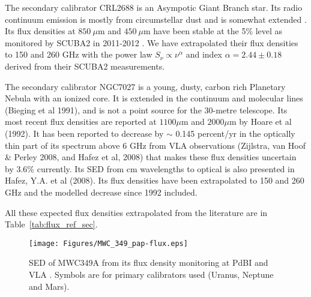 
The secondary calibrator CRL2688 is an Asympotic Giant Branch
star. Its radio continuum emission is mostly from circumstellar dust
and is somewhat extended \cite{Knapp}.  Its flux densities at
$850\ \mu$m and $450 \ \mu$m have been stable at the 5\% level as
monitored by SCUBA2 in 2011-2012
\cite{Dempsey}. We have extrapolated their flux densities to  150 and 260 GHz
with the power law $S_{\nu} \propto \nu^{\alpha}$ and index
$\alpha=2.44\pm0.18$ derived from their SCUBA2 measurements.


The secondary calibrator NGC7027 is a young, dusty, carbon rich
Planetary Nebula with an ionized core.  It is extended in the
continuum and molecular lines (Bieging et al 1991), and is not a point
source for the 30-metre telescope.  Its most recent flux densities are
reported at $1100\mu$m and $2000\mu$m by Hoare et al (1992). It has
been reported to decrease by $\sim$ 0.145 percent/yr in the optically
thin part of its spectrum above $6$ GHz from VLA observations
(Zijlstra, van Hoof \& Perley 2008, and Hafez et al, 2008) that makes
these flux densities uncertain by 3.6\% currently. Its SED from cm
wavelengths to optical is also presented in Hafez, Y.A. et al (2008).
Its flux densities have been extrapolated to 150 and 260 GHz and the
modelled decrease since 1992 included.

All these expected flux densities extrapolated from the literature are in Table~\ref{tab:flux_ref_sec}.

\begin{figure}[h]
\begin{center}
  \texttt{[image: Figures/MWC\_349\_pap-flux.eps]}
  \caption[MWC349 spectral energy density]{SED of MWC349A from its flux density monitoring at PdBI and VLA \cite{krips}.
  Symbols are for primary calibrators used (Uranus, Neptune and Mars).}
\label{fig:Krips2017}
\end{center}
\end{figure}




